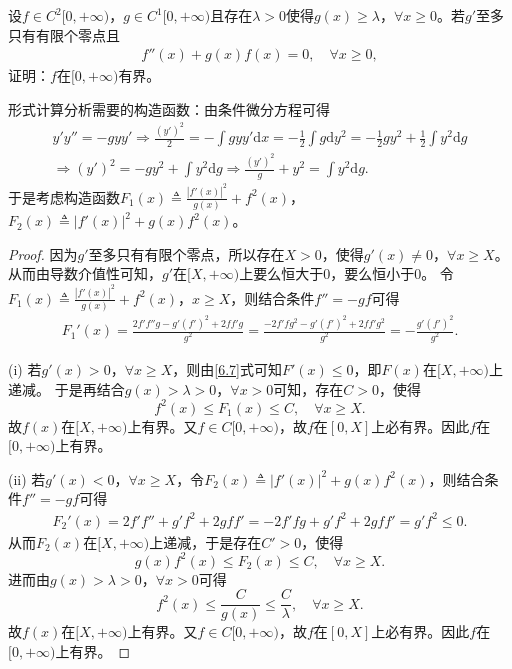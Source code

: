\documentclass[../../main.tex]{subfiles}
\begin{document}
\begin{example}
设\(f \in C^{2}[0, +\infty)\)，\(g \in C^{1}[0, +\infty)\)且存在\(\lambda > 0\)使得\(g(x) \geqslant \lambda\)，\(\forall x \geqslant 0\)。若\(g'\)至多只有有限个零点且
\begin{align*}
f''(x)+g(x)f(x) = 0,\quad\forall x \geqslant 0,
\end{align*}
证明：\(f\)在\([0, +\infty)\)有界。
\end{example}
\begin{note}
形式计算分析需要的构造函数：由条件微分方程可得
\begin{align*}
y'y'' =-gyy' \Rightarrow \frac{( y' )^2}{2}=-\int{gyy'\mathrm{d}x}=-\frac{1}{2}\int{g\mathrm{d}y^2}=-\frac{1}{2}gy^2+\frac{1}{2}\int{y^2\mathrm{d}g}
\\
\Rightarrow ( y' )^2=-gy^2+\int{y^2\mathrm{d}g}\Rightarrow \frac{( y' )^2}{g}+y^2=\int{y^2\mathrm{d}g}.
\end{align*}
于是考虑构造函数\(F_1( x ) \triangleq \frac{| f'( x ) |^2}{g( x )}+f^2( x )\)，\(F_2( x ) \triangleq | f'( x ) |^2+g( x ) f^2( x )\)。
\end{note}
\begin{proof}
因为\(g'\)至多只有有限个零点，所以存在\(X>0\)，使得\(g'( x ) \ne 0\)，\(\forall x\geqslant X\)。从而由导数介值性可知，\(g'\)在\([ X,+\infty )\)上要么恒大于\(0\)，要么恒小于\(0\)。
令\(F_1( x ) \triangleq \frac{| f'( x ) |^2}{g( x )}+f^2( x )\)，\(x\geqslant X\)，则结合条件\(f'' =-gf\)可得
\begin{align}
F_{1}'( x ) =\frac{2f'f'' g-g'( f' )^2+2ff' g}{g^2}=\frac{-2f'fg^2-g'( f' )^2+2ff'g^2}{g^2}=-\frac{g'( f' )^2}{g^2}. \label{6.7}
\end{align}

(i) 若\(g'( x ) >0\)，\(\forall x\geqslant X\)，则由\eqref{6.7}式可知\(F'( x ) \leqslant 0\)，即\(F( x )\)在\([ X,+\infty )\)上递减。
于是再结合\(g( x ) >\lambda >0\)，\(\forall x>0\)可知，存在\(C>0\)，使得
\[
f^2( x ) \leqslant F_1( x ) \leqslant C,\quad\forall x\geqslant X.
\]
故\(f( x )\)在\([ X,+\infty )\)上有界。又\(f\in C[ 0,+\infty )\)，故\(f\)在\([ 0,X ]\)上必有界。因此\(f\)在\([ 0,+\infty )\)上有界。

(ii) 若\(g'( x ) <0\)，\(\forall x\geqslant X\)，令\(F_2( x ) \triangleq | f'( x ) |^2+g( x ) f^2( x )\)，则结合条件\(f'' =-gf\)可得
\begin{align}
F_{2}'( x ) =2f'f'' +g'f^2+2gff' =-2f'fg+g'f^2+2gff' =g'f^2\leqslant 0. \label{6.8}
\end{align}
从而\(F_2( x )\)在\([ X,+\infty )\)上递减，于是存在\(C'>0\)，使得
\[
g( x ) f^2( x ) \leqslant F_2( x ) \leqslant C,\quad\forall x\geqslant X.
\]
进而由\(g( x ) >\lambda >0\)，\(\forall x>0\)可得
\[
f^2( x ) \leqslant \frac{C}{g( x )}\leqslant \frac{C}{\lambda},\quad\forall x\geqslant X.
\]
故\(f( x )\)在\([ X,+\infty )\)上有界。又\(f\in C[ 0,+\infty )\)，故\(f\)在\([ 0,X ]\)上必有界。因此\(f\)在\([ 0,+\infty )\)上有界。
\end{proof}
\end{document}
